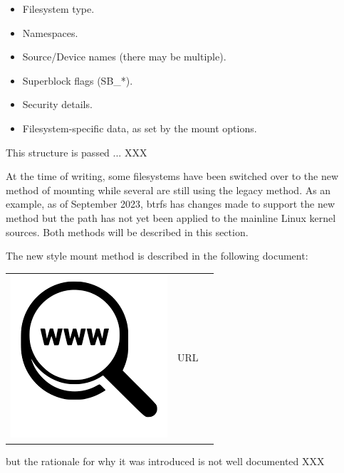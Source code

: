 \begin{itemize}
	\item Filesystem type.
	\item Namespaces.
	\item Source/Device names (there may be multiple).
	\item Superblock flags (SB\_*).
	\item Security details.
	\item Filesystem-specific data, as set by the mount options.
\end{itemize}

\noindent
This structure is passed ... XXX

At the time of writing, some filesystems have been switched over to the new method of mounting while several are still using the legacy method. As an example, as of September 2023, btrfs has changes made to support the new method but the path has not yet been applied to the mainline Linux kernel sources. Both methods will be described in this section.


The new style mount method is described in the following document:

\begin{table}[h]
\begin{tabular}{lcl}
\parbox[r]{0.5in}{\includegraphics[scale=0.15]{figures/url.png}} & \parbox[l]{0.55in}{URL } & \parbox[l]{3in}{}
\end{tabular}
\end{table}

\noindent
but the rationale for why it was introduced is not well documented XXX

